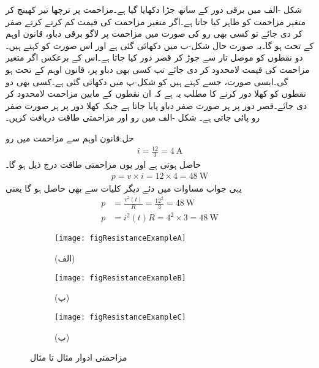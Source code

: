 شکل -الف میں برقی دور کے ساتھ  جڑا دکھایا گیا ہے۔مزاحمت پر ترچھا تیر کھینچ کر متغیر مزاحمت کو ظاہر کیا جاتا ہے۔اگر متغیر مزاحمت کی قیمت کم کرتے کرتے صفر کر دی جائے تو کسی بھی رو  کی صورت میں مزاحمت پر لاگو برقی دباو، قانون اوہم کے تحت  ہو گا۔یہ صورت حال شکل-ب میں دکھائی گئی ہے اور اس صورت کو  کہتے ہیں۔ دو نقطوں کو موصل تار سے جوڑ کر قصر دور کیا جاتا ہے۔اس کے برعکس اگر متغیر مزاحمت کی قیمت لامحدود کر دی جائے تب کسی بھی دباو  پر، قانون اوہم کے تحت  ہو گی۔ایسی صورت، جسے  کہتے ہیں کو شکل-پ میں دکھائی گئی ہے۔کسی بھی دو نقطوں کو کھلا دور کرنے کا مطلب یہ ہے کہ ان  نقطوں کے مابین مزاحمت لامحدود کر دی جائے۔قصر دور پر ہر صورت صفر دباو پایا جاتا ہے جبکہ کھلا دور پر ہر صورت صفر رو پائی جاتی ہے۔
\FloatBarrier
شکل -الف میں رو اور مزاحمتی طاقت دریافت کریں۔

حل:قانون اوہم سے مزاحمت میں رو
\begin{align*}
i=\frac{12}{3}=\SI{4}{\ampere}
\end{align*}
حاصل ہوتی ہے اور یوں مزاحمتی طاقت درج ذیل ہو گا۔
\begin{align*}
p=v \times i =12 \times 4=\SI{48}{\watt}
\end{align*}
یہی جواب مساوات  میں دئے  دیگر کلیات سے بھی حاصل ہو گا یعنی
\begin{align*}
p&=\frac{v^2(t)}{R}=\frac{12^2}{3}=\SI{48}{\watt}\\
p&=i^2(t) R=4^2 \times 3=\SI{48}{\watt}
\end{align*} 

\begin{figure}
\centering
\begin{subfigure}{0.3\textwidth}
\texttt{[image: figResistanceExampleA]}
\caption*{(الف)}
\end{subfigure}%
%
\begin{subfigure}{0.3\textwidth}
\texttt{[image: figResistanceExampleB]}
\caption*{(ب)}
\end{subfigure}%
%
\begin{subfigure}{0.3\textwidth}
\texttt{[image: figResistanceExampleC]}
\caption*{(پ)}
\end{subfigure}
\caption{مزاحمتی ادوار مثال  تا مثال }
\label{شکل_مزاحمتی_اکلوتا_مزاحمت_کی_طاقت}
\end{figure}

